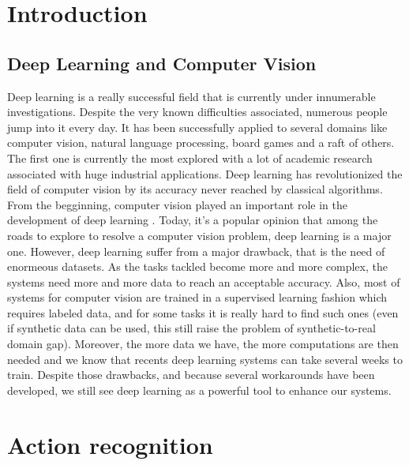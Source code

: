 \documentclass[12pt, a4paper]{report}
\begin{document}
	\makeutbmfrontcover{}

	\tableofcontents
	
	\chapter{Introduction}
	\section{Deep Learning and Computer Vision}
	Deep learning is a really successful field that is currently under innumerable investigations. Despite the very known difficulties associated, numerous people jump into it every day.
	It has been successfully applied to several domains like computer vision, natural language processing, board games and a raft of others.
	The first one is currently the most explored with a lot of academic research associated with huge industrial applications.
	Deep learning has revolutionized the field of computer vision by its accuracy never reached by classical algorithms.
	From the begginning, computer vision played an important role in the development of deep learning \cite{lecun_zipcode,lecun_mnist}.
	Today, it's a popular opinion that among the roads to explore to resolve a computer vision problem, deep learning is a major one.
	However, deep learning suffer from a major drawback, that is the need of enormeous datasets.
	As the tasks tackled become more and more complex, the systems need more and more data to reach an acceptable accuracy.
	Also, most of systems for computer vision are trained in a supervised learning fashion which requires labeled data, and for some tasks it is really hard to find such ones (even if synthetic data can be used, this still raise the problem of synthetic-to-real domain gap).
	Moreover, the more data we have, the more computations are then needed and we know that recents deep learning systems can take several weeks to train.
	Despite those drawbacks, and because several workarounds have been developed, we still see deep learning as a powerful tool to enhance our systems.
	

	\chapter{Action recognition}

	
	
	\makeutbmbackcover{}
\end{document}
